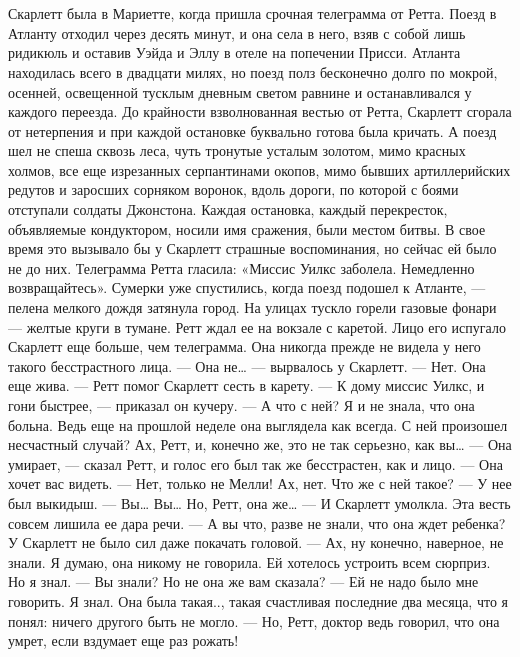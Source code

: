 \chapter{\ }

Скарлетт была в Мариетте, когда пришла срочная телеграмма от Ретта. Поезд в Атланту отходил через десять минут, и она села в него, взяв с собой лишь ридикюль и оставив Уэйда и Эллу в отеле на попечении Присси.
Атланта находилась всего в двадцати милях, но поезд полз бесконечно долго по мокрой, осенней, освещенной тусклым дневным светом равнине и останавливался у каждого переезда. До крайности взволнованная вестью от Ретта, Скарлетт сгорала от нетерпения и при каждой остановке буквально готова была кричать. А поезд шел не спеша сквозь леса, чуть тронутые усталым золотом, мимо красных холмов, все еще изрезанных серпантинами окопов, мимо бывших артиллерийских редутов и заросших сорняком воронок, вдоль дороги, по которой с боями отступали солдаты Джонстона. Каждая остановка, каждый перекресток, объявляемые кондуктором, носили имя сражения, были местом битвы. В свое время это вызывало бы у Скарлетт страшные воспоминания, но сейчас ей было не до них.
Телеграмма Ретта гласила: «Миссис Уилкс заболела. Немедленно возвращайтесь».
Сумерки уже спустились, когда поезд подошел к Атланте, — пелена мелкого дождя затянула город. На улицах тускло горели газовые фонари — желтые круги в тумане. Ретт ждал ее на вокзале с каретой. Лицо его испугало Скарлетт еще больше, чем телеграмма. Она никогда прежде не видела у него такого бесстрастного лица.
— Она не… — вырвалось у Скарлетт.
— Нет. Она еще жива. — Ретт помог Скарлетт сесть в карету. — К дому миссис Уилкс, и гони быстрее, — приказал он кучеру.
— А что с ней? Я и не знала, что она больна. Ведь еще на прошлой неделе она выглядела как всегда. С ней произошел несчастный случай? Ах, Ретт, и, конечно же, это не так серьезно, как вы…
— Она умирает, — сказал Ретт, и голос его был так же бесстрастен, как и лицо. — Она хочет вас видеть.
— Нет, только не Мелли! Ах, нет. Что же с ней такое?
— У нее был выкидыш.
— Вы… Вы… Но, Ретт, она же… — И Скарлетт умолкла. Эта весть совсем лишила ее дара речи.
— А вы что, разве не знали, что она ждет ребенка? У Скарлетт не было сил даже покачать головой.
— Ах, ну конечно, наверное, не знали. Я думаю, она никому не говорила. Ей хотелось устроить всем сюрприз. Но я знал.
— Вы знали? Но не она же вам сказала?
— Ей не надо было мне говорить. Я знал. Она была такая.., такая счастливая последние два месяца, что я понял: ничего другого быть не могло.
— Но, Ретт, доктор ведь говорил, что она умрет, если вздумает еще раз рожать!
